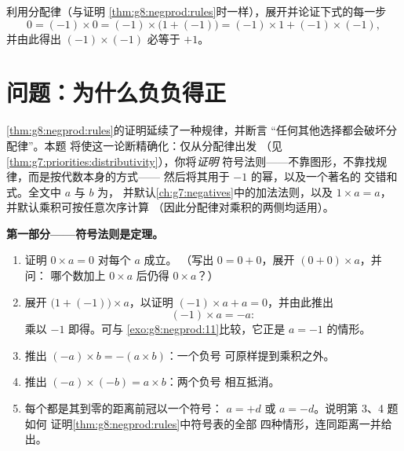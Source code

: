 \begin{exercise}[$\star\star\star$]\label{exo:g8:negprod:11}
利用分配律（与证明
\cref{thm:g8:negprod:rules}时一样），展开并论证下式的每一步
\[
0 = (-1) \times 0 = (-1) \times \bigl(1 + (-1)\bigr)
= (-1) \times 1 + (-1) \times (-1),
\]
并由此得出 $(-1) \times (-1)$ 必等于 $+1$。
\end{exercise}

\section{问题：为什么负负得正}

\begin{problem}
\label{pb:g8:negprod:1}
\cref{thm:g8:negprod:rules}的证明延续了一种规律，并断言
“任何其他选择都会破坏分配律”。本题
将使这一论断精确化：仅从分配律出发
（见\cref{thm:g7:priorities:distributivity}），你将\emph{证明}
符号法则——不靠图形，不靠找规律，而是按代数本身的方式——
然后将其用于 $-1$ 的幂，以及一个著名的
交错和式。全文中 $a$ 与 $b$ 为，
并默认\cref{ch:g7:negatives}中的加法法则，以及
$1 \times a = a$，并默认乘积可按任意次序计算
（因此分配律对乘积的两侧均适用）。

\medskip
\noindent\textbf{第一部分——符号法则是定理。}
\begin{enumerate}
  \item 证明 $0 \times a = 0$ 对每个 $a$ 成立。
        （写出 $0 = 0 + 0$，展开 $(0 + 0) \times a$，并问：
        哪个数加上 $0 \times a$ 后仍得 $0 \times a$？）
  \item 展开 $\bigl(1 + (-1)\bigr) \times a$，以证明
        $(-1) \times a + a = 0$，并由此推出
        \[
        (-1) \times a = -a :
        \]
        乘以 $-1$ 即得。可与
        \cref{exo:g8:negprod:11}比较，它正是 $a = -1$ 的情形。
  \item 推出 $(-a) \times b = -(a \times b)$：一个负号
        可原样提到乘积之外。
  \item 推出 $(-a) \times (-b) = a \times b$：两个负号
        相互抵消。
  \item 每个都是其到零的距离前冠以一个符号：
        $a = +d$ 或 $a = -d$。说明第 3、4 题如何
        证明\cref{thm:g8:negprod:rules}中符号表的全部
        四种情形，连同距离一并给出。
\end{enumerate}


\end{problem}
